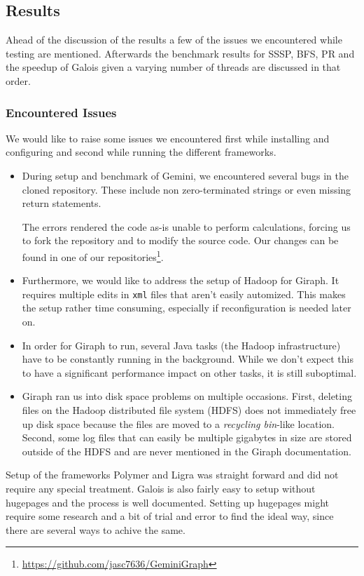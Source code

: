 
\subsection{Results}
Ahead of the discussion of the results a few of the issues we encountered while testing are mentioned. Afterwards the benchmark results for SSSP, BFS, PR and the speedup of Galois given a varying number of threads are discussed in that order.


\subsubsection{Encountered Issues}
We would like to raise some issues we encountered first while installing and configuring and second while running the different frameworks.

\begin{itemize}
	\item During setup and benchmark of Gemini, we encountered several bugs in the cloned repository. These include non zero-terminated strings or even missing return statements.

	The errors rendered the code as-is unable to perform calculations, forcing us to fork the repository and to modify the source code. Our changes can be found in one of our repositories\footnote{\url{https://github.com/jasc7636/GeminiGraph}}.

	\item Furthermore, we would like to address the setup of Hadoop for Giraph. It requires multiple edits in \texttt{xml} files that aren't easily automized. This makes the setup rather time consuming, especially if reconfiguration is needed later on.
	\item In order for Giraph to run, several Java tasks (the Hadoop infrastructure) have to be constantly running in the background. While we don't expect this to have a significant performance impact on other tasks, it is still suboptimal.
	\item Giraph ran us into disk space problems on multiple occasions. First, deleting files on the Hadoop distributed file system (HDFS) does not immediately free up disk space because the files are moved to a \emph{recycling bin}-like location. Second, some log files that can easily be multiple gigabytes in size are stored outside of the HDFS and are never mentioned in the Giraph documentation.
\end{itemize}
\noindent
Setup of the frameworks Polymer and Ligra was straight forward and did not require any special treatment.
Galois is also fairly easy to setup without hugepages and the process is well documented. 
Setting up hugepages might require some research and a bit of trial and error to find the ideal way, since there are several ways to achive the same.





